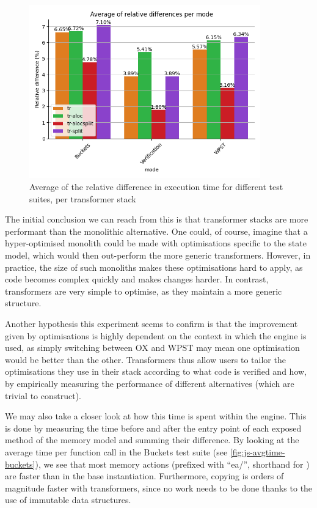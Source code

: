 \begin{figure}
	\centering
	\includegraphics[width=10cm]{figures/js-perf-bars.png}
	\caption{Average of the relative difference in execution time for different test suites, per transformer stack}
	\label{fig:js-perf-bars}
\end{figure}

The initial conclusion we can reach from this is that transformer stacks are  more performant than the monolithic alternative. One could, of course, imagine that a hyper-optimised monolith could be made with optimisations specific to the state model, which would then out-perform the more generic transformers. However, in practice, the size of such monoliths makes these optimisations hard to apply, as code becomes complex quickly and makes changes harder. In contrast, transformers are very simple to optimise, as they maintain a more generic structure.

Another hypothesis this experiment seems to confirm is that the improvement given by optimisations is highly dependent on the context in which the engine is used, as simply switching between OX and WPST may mean one optimisation would be better than the other. Transformers thus allow users to tailor the optimisations they use in their stack according to what code is verified and how, by empirically measuring the performance of different alternatives (which are trivial to construct).

We may also take a closer look at how this time is spent within the engine. This is done by measuring the time before and after the entry point of each exposed method of the memory model and summing their difference. By looking at the average time per function call in the Buckets test suite (see \autoref{fig:js-avgtime-buckets}), we see that most memory actions (prefixed with ``ea/'', shorthand for \execac) are faster than in the base instantiation. Furthermore, copying is orders of magnitude faster with transformers, since no work needs to be done thanks to the use of immutable data structures.

